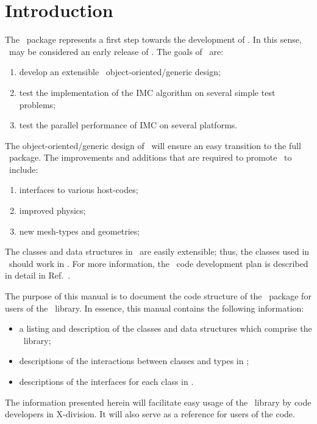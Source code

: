 
\section{Introduction}

The \imctest\ package represents a first step towards the development
of \milagro.  In this sense, \imctest\ may be considered an early
release of \milagro.  The goals of \imctest\ are:
\begin{enumerate}
\item develop an extensible \cpp\ object-oriented/generic design;
\item test the implementation of the IMC algorithm on several simple
  test problems;
\item test the parallel performance of IMC on several platforms.
\end{enumerate}
The object-oriented/generic design of \imctest\ will ensure an easy
transition to the full \milagro\ package.  The improvements and
additions that are required to promote \imctest\ to \milagro\ include:
\begin{enumerate}
\item interfaces to various host-codes;
\item improved physics;
\item new mesh-types and geometries;
\end{enumerate}
The classes and data structures in \imctest\ are easily extensible;
thus, the classes used in \imctest\ should work in \milagro. For more
information, the \jayenne\ code development plan is described in
detail in Ref.~.

The purpose of this manual is to document the code structure of the
\imctest\ package for users of the \imctest\ library.  In essence, this
manual contains the following information:
\begin{itemize}
\item a listing and description of the classes and data structures
  which comprise the \imctest\ library;
\item descriptions of the interactions between classes and types in
  \imctest;
\item descriptions of the interfaces for each class in \imctest.
\end{itemize}
The information presented herein will facilitate easy usage of the
\imctest\ library by code developers in X-division.  It will also serve
as a reference for users of the code.

